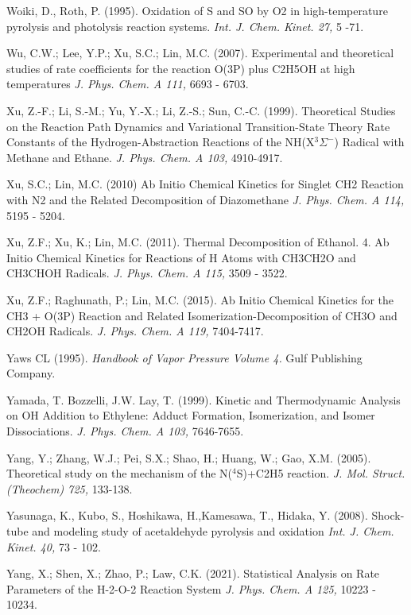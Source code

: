 \documentclass[12pt,landscape]{article}
\newcounter{reaction}
\newcounter{photo}
\begin{document}
Woiki, D., Roth, P. (1995). Oxidation of S and SO by O2 in high-temperature pyrolysis and photolysis reaction systems. {\em Int. J. Chem. Kinet. 27,} 5 -71.

Wu, C.W.; Lee, Y.P.; Xu, S.C.; Lin, M.C. (2007).
Experimental and theoretical studies of rate coefficients for the reaction O(3P) plus C2H5OH at high temperatures
{\em  J. Phys. Chem. A 111,} 6693 - 6703.

Xu, Z.-F.; Li, S.-M.; Yu, Y.-X.; Li, Z.-S.; Sun, C.-C. (1999).  Theoretical Studies on the Reaction Path Dynamics and Variational Transition-State Theory Rate Constants of the Hydrogen-Abstraction Reactions of the NH(X$^3\Sigma^-$) Radical with Methane and Ethane. {\em J. Phys. Chem. A 103,} 4910-4917.

Xu, S.C.; Lin, M.C. (2010)
Ab Initio Chemical Kinetics for Singlet CH2 Reaction with N2 and the Related Decomposition of Diazomethane
{\em  J. Phys. Chem. A  114,} 5195 - 5204.

Xu, Z.F.; Xu, K.; Lin, M.C. (2011).
Thermal Decomposition of Ethanol. 4. Ab Initio Chemical Kinetics for Reactions of H Atoms with CH3CH2O and CH3CHOH Radicals.
{\em J. Phys. Chem. A 115,} 3509 - 3522.

Xu, Z.F.; Raghunath, P.; Lin, M.C. (2015).
Ab Initio Chemical Kinetics for the CH3 + O(3P) Reaction and Related Isomerization-Decomposition of CH3O and CH2OH Radicals.
{\em J. Phys. Chem. A 119,} 7404-7417. 

Yaws CL (1995).  {\em Handbook of Vapor Pressure Volume 4.}
Gulf Publishing Company.

Yamada, T. Bozzelli, J.W. Lay, T. (1999). Kinetic and Thermodynamic Analysis on OH Addition to Ethylene: Adduct Formation, Isomerization, and Isomer Dissociations.
{\em J. Phys. Chem. A  103,} 7646-7655.

Yang, Y.; Zhang, W.J.; Pei, S.X.; Shao, H.; Huang, W.; Gao, X.M. (2005). Theoretical study on the mechanism of the N($^4$S)+C2H5 reaction.  {\em J. Mol. Struct. (Theochem) 725,} 133-138.

Yasunaga, K., Kubo, S., Hoshikawa, H.,Kamesawa, T., Hidaka, Y. (2008). Shock-tube and modeling study of acetaldehyde pyrolysis and oxidation
{\em Int. J. Chem. Kinet. 40,} 73 - 102.

Yang, X.; Shen, X.; Zhao, P.; Law, C.K. (2021).
Statistical Analysis on Rate Parameters of the H-2-O-2 Reaction System
{\em J. Phys. Chem. A 125,} 10223 - 10234.
\end{document}
